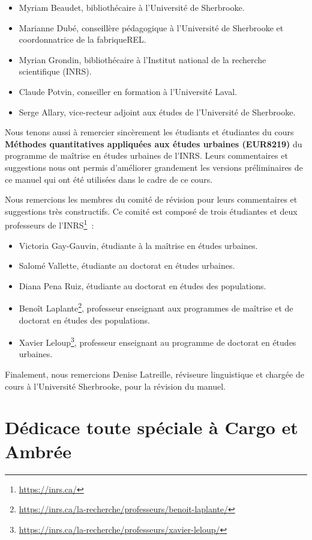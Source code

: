 \documentclass[
  11pt,
  french,
]{book}
\providecommand{\tightlist}{%
  \setlength{\itemsep}{0pt}\setlength{\parskip}{0pt}}
\renewcommand{\href}[2]{#2\footnote{\url{#1}}}
\begin{document}
\begin{itemize}
\tightlist
\item
  Myriam Beaudet, bibliothécaire à l'Université de Sherbrooke.
\item
  Marianne Dubé, conseillère pédagogique à l'Université de Sherbrooke et coordonnatrice de la fabriqueREL.
\item
  Myrian Grondin, bibliothécaire à l'Institut national de la recherche scientifique (INRS).
\item
  Claude Potvin, conseiller en formation à l'Université Laval.
\item
  Serge Allary, vice-recteur adjoint aux études de l'Université de Sherbrooke.
\end{itemize}

Nous tenons aussi à remercier sincèrement les étudiants et étudiantes du cours \textbf{Méthodes quantitatives appliquées aux études urbaines (EUR8219)} du programme de maîtrise en études urbaines de l'INRS. Leurs commentaires et suggestions nous ont permis d'améliorer grandement les versions préliminaires de ce manuel qui ont été utilisées dans le cadre de ce cours.

Nous remercions les membres du comité de révision pour leurs commentaires et suggestions très constructifs. Ce comité est composé de trois étudiantes et deux professeurs de l'\href{https://inrs.ca/}{INRS}~:

\begin{itemize}
\tightlist
\item
  Victoria Gay-Gauvin, étudiante à la maîtrise en études urbaines.
\item
  Salomé Vallette, étudiante au doctorat en études urbaines.
\item
  Diana Pena Ruiz, étudiante au doctorat en études des populations.
\item
  \href{https://inrs.ca/la-recherche/professeurs/benoit-laplante/}{Benoît Laplante}, professeur enseignant aux programmes de maîtrise et de doctorat en études des populations.
\item
  \href{https://inrs.ca/la-recherche/professeurs/xavier-leloup/}{Xavier Leloup}, professeur enseignant au programme de doctorat en études urbaines.
\end{itemize}

Finalement, nous remercions Denise Latreille, réviseure linguistique et chargée de cours à l'Université Sherbrooke, pour la révision du manuel.

\hypertarget{sect007}{%
\section*{Dédicace toute spéciale à Cargo et Ambrée}\label{sect007}}
\end{document}
